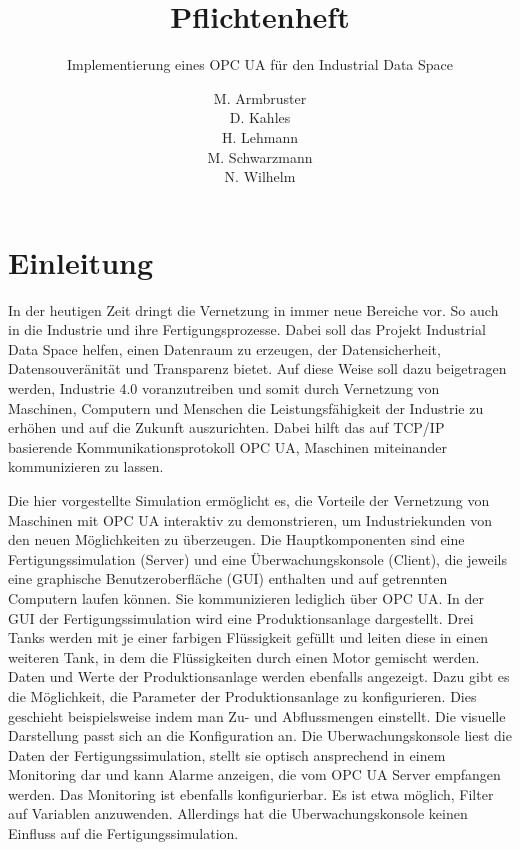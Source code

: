 \documentclass[parskip=full]{scrartcl}
\title{Pflichtenheft}
\subtitle{Implementierung eines \gls{OPC UA} \glslink{Systemadapter}{Systemadapters} für den \gls{Industrial Data Space}}
\author{
    M. Armbruster\\
    D. Kahles\\
    H. Lehmann\\
    M. Schwarzmann\\
    N. Wilhelm
}
\begin{document}
\maketitle
\pagebreak
\tableofcontents
\pagebreak

\section{Einleitung}
In der heutigen Zeit dringt die Vernetzung in immer neue Bereiche vor. So auch in die Industrie und ihre Fertigungsprozesse.
Dabei soll das Projekt \gls{Industrial Data Space} helfen, einen Datenraum zu erzeugen, der Datensicherheit, Datensouveränität und
Transparenz bietet. Auf diese Weise soll dazu beigetragen werden, Industrie 4.0 voranzutreiben und somit durch Vernetzung von
Maschinen, Computern und Menschen die Leistungsfähigkeit der Industrie zu erhöhen und auf die Zukunft auszurichten.
Dabei hilft das auf \gls{TCP/IP} basierende Kommunikationsprotokoll \gls{OPC UA}, Maschinen miteinander kommunizieren zu lassen.

Die hier vorgestellte Simulation ermöglicht es, die Vorteile der Vernetzung von Maschinen mit \gls{OPC UA} interaktiv zu demonstrieren, um Industriekunden von den neuen Möglichkeiten zu überzeugen.
Die Hauptkomponenten sind eine \gls{Fertigungssimulation} (Server) und eine \gls{Überwachungskonsole} (Client),
die jeweils eine graphische Benutzeroberfläche (\gls{GUI}) enthalten und auf getrennten Computern laufen können.
Sie kommunizieren lediglich über \gls{OPC UA}.
In der GUI der \gls{Fertigungssimulation} wird eine \gls{Produktionsanlage} dargestellt.
Drei Tanks werden mit je einer farbigen Flüssigkeit gefüllt und leiten diese in einen weiteren Tank,
in dem die Flüssigkeiten durch einen Motor gemischt werden. Daten und Werte der \gls{Produktionsanlage} werden ebenfalls angezeigt. Dazu gibt es
die Möglichkeit, die Parameter der \gls{Produktionsanlage} zu konfigurieren. Dies geschieht beispielsweise indem man Zu- und Abflussmengen einstellt. Die visuelle Darstellung passt sich an die Konfiguration an.
Die \gls{Uberwachungskonsole} liest die Daten der \gls{Fertigungssimulation}, stellt sie optisch ansprechend in einem Monitoring dar
und kann Alarme anzeigen, die vom \gls{OPC UA} Server empfangen werden. Das Monitoring ist ebenfalls konfigurierbar. Es ist etwa möglich, Filter auf Variablen anzuwenden. Allerdings hat die \gls{Uberwachungskonsole} keinen Einfluss auf die \gls{Fertigungssimulation}.

\pagebreak
\end{document}

